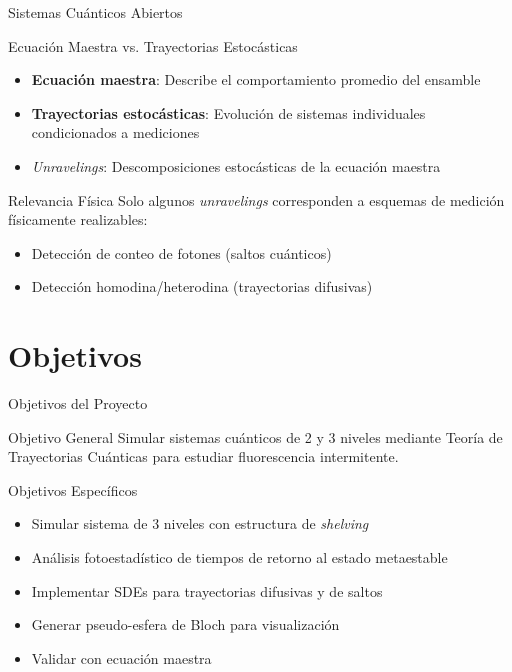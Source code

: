 \documentclass[10pt,xcolor=dvipsnames]{beamer}
\begin{document}
\begin{frame}{Sistemas Cuánticos Abiertos}
    \begin{block}{Ecuación Maestra vs. Trayectorias Estocásticas}
        \begin{itemize}
            \item \textbf{Ecuación maestra}: Describe el comportamiento promedio del ensamble
            \item \textbf{Trayectorias estocásticas}: Evolución de sistemas individuales condicionados a mediciones
            \item \textit{Unravelings}: Descomposiciones estocásticas de la ecuación maestra
        \end{itemize}
    \end{block}
    
    \begin{exampleblock}{Relevancia Física}
        Solo algunos \textit{unravelings} corresponden a esquemas de medición físicamente realizables:
        \begin{itemize}
            \item Detección de conteo de fotones (saltos cuánticos)
            \item Detección homodina/heterodina (trayectorias difusivas)
        \end{itemize}
    \end{exampleblock}
\end{frame}

\section{Objetivos}
\begin{frame}{Objetivos del Proyecto}
    \begin{block}{Objetivo General}
        Simular sistemas cuánticos de 2 y 3 niveles mediante Teoría de Trayectorias Cuánticas para estudiar fluorescencia intermitente.
    \end{block}
    
    \begin{block}{Objetivos Específicos}
        \begin{itemize}
            \item Simular sistema de 3 niveles con estructura de \textit{shelving}
            \item Análisis fotoestadístico de tiempos de retorno al estado metaestable
            \item Implementar SDEs para trayectorias difusivas y de saltos
            \item Generar pseudo-esfera de Bloch para visualización
            \item Validar con ecuación maestra
        \end{itemize}
    \end{block}
\end{frame}
\end{document}

